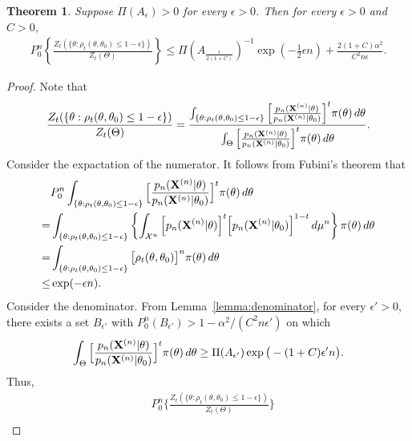 \documentclass[11pt, letterpaper]{article}
\theoremstyle{plain}
\newtheorem{theorem}{\quad\quad Theorem}
\theoremstyle{definition}
\theoremstyle{remark}
\begin{document}
\begin{theorem}
    Suppose $\Pi(A_{\epsilon})>0$ for every $\epsilon>0$.
    Then for every $\epsilon>0$ and $C>0$,
     $$
     \begin{aligned}
         P_0^n \left\{ \frac{Z_t ( \{\theta:\rho_{t}(\theta,\theta_0)\leq 1- \epsilon\} )}{Z_t(\Theta)}
         \right\}
         \leq {\Pi(A_{\frac{\epsilon}{2(1+C)}})}^{-1}\exp (-\frac{1}{2}\epsilon n) +\frac{2(1+C)\alpha^2}{C^2 n\epsilon}.
     \end{aligned}
     $$
\end{theorem}
\begin{proof}
    Note that
       $$
       \frac{Z_t ( \{\theta:\rho_{t}(\theta,\theta_0)\leq 1- \epsilon\} )}{Z_t(\Theta)}
=
    \frac{
        \int_{\{\theta:\rho_{t}(\theta,\theta_0)\leq 1- \epsilon\}} \Big[ \frac{p_n(\BX^{(n)}|\theta)}{p_n(\BX^{(n)}|\theta_0)} \Big]^{t} \pi(\theta) \, d \theta
    }{
        \int_{\Theta} \Big[ \frac{p_n(\BX^{(n)}|\theta)}{p_n(\BX^{(n)}|\theta_0)} \Big]^{t} \pi(\theta) \, d \theta
    }.
       $$ 
Consider the expactation of the numerator. It follows from Fubini's theorem that
    $$
    \begin{aligned}
        &P_0^n\int_{\{\theta:\rho_{t}(\theta,\theta_0)\leq 1- \epsilon\}} \Big[ \frac{p_n(\BX^{(n)}|\theta)}{p_n(\BX^{(n)}|\theta_0)}  \Big]^{t} \pi(\theta) \, d \theta
        \\
        =&
        \int_{\{\theta:\rho_{t}(\theta,\theta_0)\leq 1- \epsilon\}} \left\{\int_{\mathcal{X}^n}\Big[ {p_n} (\BX^{(n)}|\theta) \Big]^{t}  \Big[ p_n (\BX^{(n)}|\theta_0) \Big]^{1-t} \, d\mu^n \right\} \pi(\theta) \, d \theta\\
        =&
        \int_{\{\theta:\rho_{t}(\theta,\theta_0)\leq 1- \epsilon\}} \big[ \rho_{t}(\theta,\theta_0) \big]^n \pi(\theta) \, d \theta\\
        \leq&
        \exp (-\epsilon n).
    \end{aligned}
    $$
    Consider the denominator.
     From Lemma~\ref{lemma:denominator}, for every $\epsilon'>0$, there exists a set $B_{\epsilon'}$ with $P_0^n(B_{\epsilon'})>1-\alpha^2/(C^2 n \epsilon')$ on which
     $$
     \int_{\Theta}\Big[\frac{p_n(\BX^{(n)}|\theta)}{p_n(\BX^{(n)}|\theta_0)}\Big]^{t} \pi(\theta)\, d\theta
     \geq \Pi(A_{\epsilon'}) \exp \big(-(1+C)\epsilon' n\big).
     $$
     Thus,
     $$
     \begin{aligned}
         &P_0^n \Big\{
             \frac{Z_t ( \{\theta:\rho_{t}(\theta,\theta_0)\leq 1- \epsilon\} )}{Z_t(\Theta)}
\Big\}\\

\end{aligned}$$
\end{proof}
\end{document}

